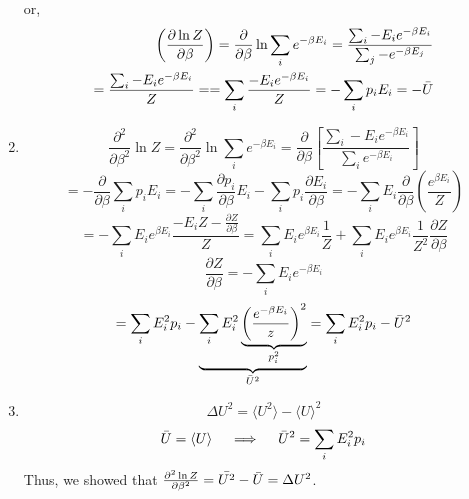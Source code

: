 \begin{enumerate}[label=(\alph*)]
            or,
            \begin{equation}
            \begin{split}
            \left(\frac{\partial \ln Z}{\partial\beta} \right)=\frac{\partial}{\partial\beta}\ln\sum_i e^{-\beta E_i} = \frac{\sum_i -E_i e^{-\beta E_i}}{\sum_j -e^{-\beta E_j}}
            \\
            =\frac{\sum_i -E_i e^{-\beta E_i}}{Z} = =\sum_i\frac{ -E_i e^{-\beta E_i}}{Z} = -\sum_i p_i E_i = -\Bar{U}
            \end{split}
            \end{equation}
            \item 
            \begin{equation*}
                \frac{\partial^2}{\partial \beta^2} \ln Z = \frac{\partial^2}{\partial \beta^2} \ln \sum_i e^{-\beta E_i} = \frac{\partial}{\partial \beta} \left[\frac{\sum_i -E_i e^{-\beta E_i}}{\sum_i e^{-\beta E_i}}\right] 
                    \end{equation*}
                    \begin{equation}      
                    = -\frac{\partial}{\partial  \beta} \sum_i p_i E_i = -\sum_i \frac{\partial p_i}{\partial \beta}E_i - \sum_i p_i \frac{\partial E_i}{\partial \beta} = -\sum_i E_i \frac{\partial}{\partial \beta} \left(\frac{e^{\beta E_i}}{Z}\right)
                    \end{equation}
                    \begin{equation*}
                    = -\sum_i E_i e^{\beta E_i} \frac{-E_i Z-\frac{\partial Z}{\partial \beta}}{Z} = \sum_i E_i e^{\beta E_i} \frac{1}{Z}+\sum_i E_i e^{\beta E_i} \frac{1}{Z^2}\frac{\partial Z}{\partial \beta}
            \end{equation*}
            \begin{equation*}
                \frac{\partial Z}{\partial \beta} = - \sum_i E_i e^{-\beta E_i}
            \end{equation*}
            \begin{equation}  
                =\sum_i E_i^2 p_i - \underbrace{
                \sum_i E_i^2 \underbrace{
                \left(\frac{e^{-\beta E_i}}{z} \right)^2
                }_{p_i^2}
                }_{\Bar{U}^2} = \sum_i E_i^2 p_i - \Bar{U}^2
            \end{equation}
            \item \begin{equation}
                \Delta U^2 = \langle U^2 \rangle-\langle U \rangle^2
            \end{equation}
            \begin{equation}
                \Bar{U}=\langle U\rangle \quad \implies \quad \Bar{U}^2 =\sum_i E_i^2p_i
            \end{equation}
            Thus, we showed that $\frac{\partial^2 \ln Z}{\partial \beta^2} = \Bar{U^2}-\Bar{U}=\Delta U^2$.
            

\end{enumerate}
